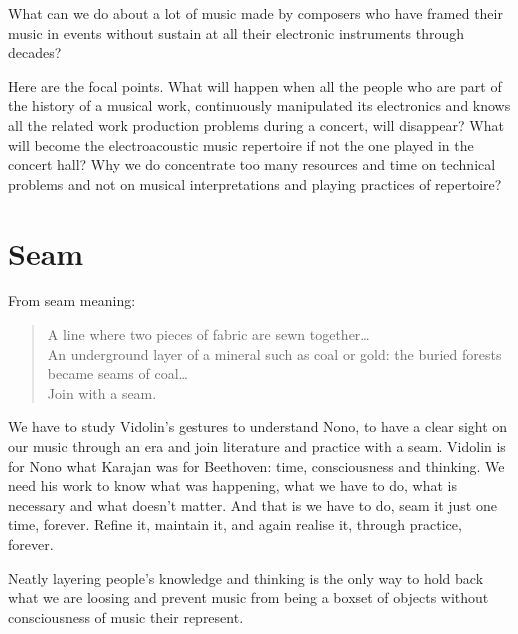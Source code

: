 \documentclass[twoside,a4paper]{article}
\begin{document}
What can we do about a lot of music made by composers who have framed their music in events without sustain at all their electronic instruments through decades?

Here are the focal points. What will happen when all the people who are part of the history of a musical work, continuously manipulated its electronics and knows all the related work production problems during a concert, will disappear? What will become the electroacoustic music repertoire if not the one played in the concert hall? Why we do concentrate too many resources and time on technical problems and not on musical interpretations and playing practices of repertoire?


\section{Seam}
\label{sec:seam}

From seam meaning:

\begin{quote}
\begin{it}
A line where two pieces of fabric are sewn together\ldots \\
An underground layer of a mineral such as coal or gold: the buried forests became seams of coal\ldots\\
Join with a seam.
\end{it}
\end{quote}

We have to study Vidolin's gestures to understand Nono, to have a clear sight on our music through an era and join literature and practice with a seam. Vidolin is for Nono what Karajan was for Beethoven: time, consciousness and thinking. We need his work to know what was happening, what we have to do, what is necessary and what doesn't matter. And that is we have to do, seam it just one time, forever. Refine it, maintain it, and again realise it, through practice, forever.

Neatly layering people's knowledge and thinking is the only way to hold back what we are loosing and prevent music from being a boxset of objects without consciousness of music their represent. 
\end{document}
